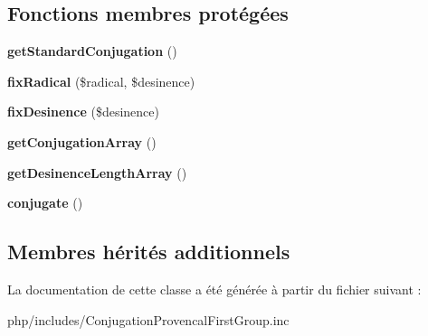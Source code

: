\subsection*{Fonctions membres protégées}
\begin{DoxyCompactItemize}
\item 
\hypertarget{classConjugationProvencalFirstGroup_aedd116ac330b4c069c860612d624badc}{}\label{classConjugationProvencalFirstGroup_aedd116ac330b4c069c860612d624badc} 
{\bfseries get\+Standard\+Conjugation} ()
\item 
\hypertarget{classConjugationProvencalFirstGroup_a58519c759619a7566d20de71b6c93dc6}{}\label{classConjugationProvencalFirstGroup_a58519c759619a7566d20de71b6c93dc6} 
{\bfseries fix\+Radical} (\$radical, \$desinence)
\item 
\hypertarget{classConjugationProvencalFirstGroup_a65b702345db86895aecf34b88f0134a7}{}\label{classConjugationProvencalFirstGroup_a65b702345db86895aecf34b88f0134a7} 
{\bfseries fix\+Desinence} (\$desinence)
\item 
\hypertarget{classConjugationProvencalFirstGroup_a65f47dc174389bc9b680cef0a3e622a2}{}\label{classConjugationProvencalFirstGroup_a65f47dc174389bc9b680cef0a3e622a2} 
{\bfseries get\+Conjugation\+Array} ()
\item 
\hypertarget{classConjugationProvencalFirstGroup_a26ccc767ad4308637e382b4dd653f43a}{}\label{classConjugationProvencalFirstGroup_a26ccc767ad4308637e382b4dd653f43a} 
{\bfseries get\+Desinence\+Length\+Array} ()
\item 
\hypertarget{classConjugationProvencalFirstGroup_ad06866f3c378d109a3e56ff8a69d660a}{}\label{classConjugationProvencalFirstGroup_ad06866f3c378d109a3e56ff8a69d660a} 
{\bfseries conjugate} ()
\end{DoxyCompactItemize}
\subsection*{Membres hérités additionnels}


La documentation de cette classe a été générée à partir du fichier suivant \+:\begin{DoxyCompactItemize}
\item 
php/includes/Conjugation\+Provencal\+First\+Group.\+inc\end{DoxyCompactItemize}
